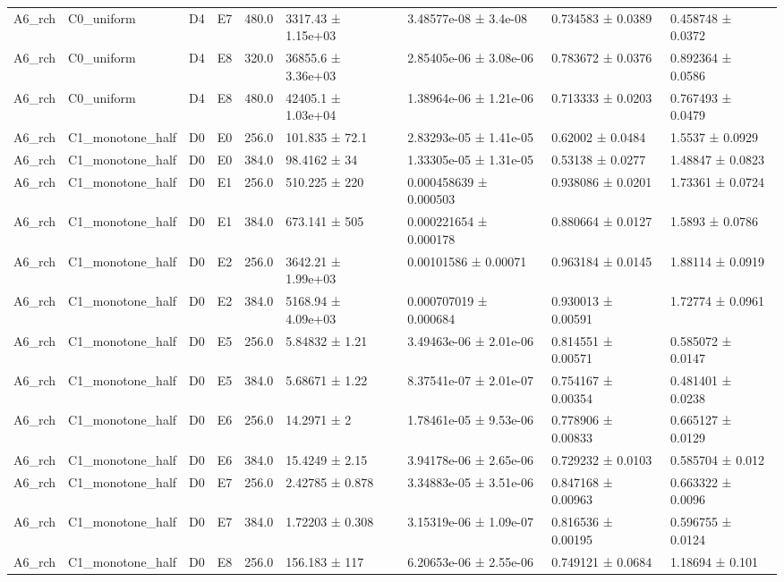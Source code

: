 \begin{table}
\begin{tabular}{lllllllll}
A6\_rch & C0\_uniform & D4 & E7 & 480.0 & 3317.43 ± 1.15e+03 & 3.48577e-08 ± 3.4e-08 & 0.734583 ± 0.0389 & 0.458748 ± 0.0372 \\
A6\_rch & C0\_uniform & D4 & E8 & 320.0 & 36855.6 ± 3.36e+03 & 2.85405e-06 ± 3.08e-06 & 0.783672 ± 0.0376 & 0.892364 ± 0.0586 \\
A6\_rch & C0\_uniform & D4 & E8 & 480.0 & 42405.1 ± 1.03e+04 & 1.38964e-06 ± 1.21e-06 & 0.713333 ± 0.0203 & 0.767493 ± 0.0479 \\
A6\_rch & C1\_monotone\_half & D0 & E0 & 256.0 & 101.835 ± 72.1 & 2.83293e-05 ± 1.41e-05 & 0.62002 ± 0.0484 & 1.5537 ± 0.0929 \\
A6\_rch & C1\_monotone\_half & D0 & E0 & 384.0 & 98.4162 ± 34 & 1.33305e-05 ± 1.31e-05 & 0.53138 ± 0.0277 & 1.48847 ± 0.0823 \\
A6\_rch & C1\_monotone\_half & D0 & E1 & 256.0 & 510.225 ± 220 & 0.000458639 ± 0.000503 & 0.938086 ± 0.0201 & 1.73361 ± 0.0724 \\
A6\_rch & C1\_monotone\_half & D0 & E1 & 384.0 & 673.141 ± 505 & 0.000221654 ± 0.000178 & 0.880664 ± 0.0127 & 1.5893 ± 0.0786 \\
A6\_rch & C1\_monotone\_half & D0 & E2 & 256.0 & 3642.21 ± 1.99e+03 & 0.00101586 ± 0.00071 & 0.963184 ± 0.0145 & 1.88114 ± 0.0919 \\
A6\_rch & C1\_monotone\_half & D0 & E2 & 384.0 & 5168.94 ± 4.09e+03 & 0.000707019 ± 0.000684 & 0.930013 ± 0.00591 & 1.72774 ± 0.0961 \\
A6\_rch & C1\_monotone\_half & D0 & E5 & 256.0 & 5.84832 ± 1.21 & 3.49463e-06 ± 2.01e-06 & 0.814551 ± 0.00571 & 0.585072 ± 0.0147 \\
A6\_rch & C1\_monotone\_half & D0 & E5 & 384.0 & 5.68671 ± 1.22 & 8.37541e-07 ± 2.01e-07 & 0.754167 ± 0.00354 & 0.481401 ± 0.0238 \\
A6\_rch & C1\_monotone\_half & D0 & E6 & 256.0 & 14.2971 ± 2 & 1.78461e-05 ± 9.53e-06 & 0.778906 ± 0.00833 & 0.665127 ± 0.0129 \\
A6\_rch & C1\_monotone\_half & D0 & E6 & 384.0 & 15.4249 ± 2.15 & 3.94178e-06 ± 2.65e-06 & 0.729232 ± 0.0103 & 0.585704 ± 0.012 \\
A6\_rch & C1\_monotone\_half & D0 & E7 & 256.0 & 2.42785 ± 0.878 & 3.34883e-05 ± 3.51e-06 & 0.847168 ± 0.00963 & 0.663322 ± 0.0096 \\
A6\_rch & C1\_monotone\_half & D0 & E7 & 384.0 & 1.72203 ± 0.308 & 3.15319e-06 ± 1.09e-07 & 0.816536 ± 0.00195 & 0.596755 ± 0.0124 \\
A6\_rch & C1\_monotone\_half & D0 & E8 & 256.0 & 156.183 ± 117 & 6.20653e-06 ± 2.55e-06 & 0.749121 ± 0.0684 & 1.18694 ± 0.101 \\

\end{tabular}
\end{table}
